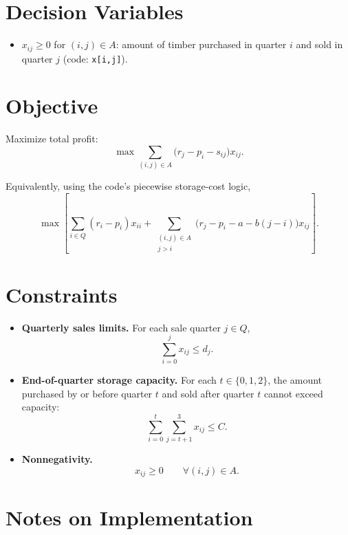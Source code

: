 \section*{Decision Variables}

\begin{itemize}
    \item $x_{ij} \ge 0$ for $(i,j)\in A$: amount of timber purchased in quarter $i$ and sold in quarter $j$ (code: \texttt{x[i,j]}).
\end{itemize}

\section*{Objective}

Maximize total profit:
\[
\max \sum_{(i,j)\in A} \bigl(r_j - p_i - s_{ij}\bigr)x_{ij}.
\]

Equivalently, using the code's piecewise storage-cost logic,
\[
\max \left[
\sum_{i\in Q} (r_i-p_i)x_{ii}
+
\sum_{\substack{(i,j)\in A\\ j>i}}
\bigl(r_j-p_i-a-b(j-i)\bigr)x_{ij}
\right].
\]

\section*{Constraints}

\begin{itemize}
    \item \textbf{Quarterly sales limits.} For each sale quarter $j\in Q$,
    \[
    \sum_{i=0}^{j} x_{ij} \le d_j.
    \]
    
    \item \textbf{End-of-quarter storage capacity.} For each $t\in\{0,1,2\}$, the amount purchased by or before quarter $t$ and sold after quarter $t$ cannot exceed capacity:
    \[
    \sum_{i=0}^{t}\sum_{j=t+1}^{3} x_{ij} \le C.
    \]
    
    \item \textbf{Nonnegativity.}
    \[
    x_{ij} \ge 0 \qquad \forall (i,j)\in A.
    \]
\end{itemize}

\section*{Notes on Implementation}

